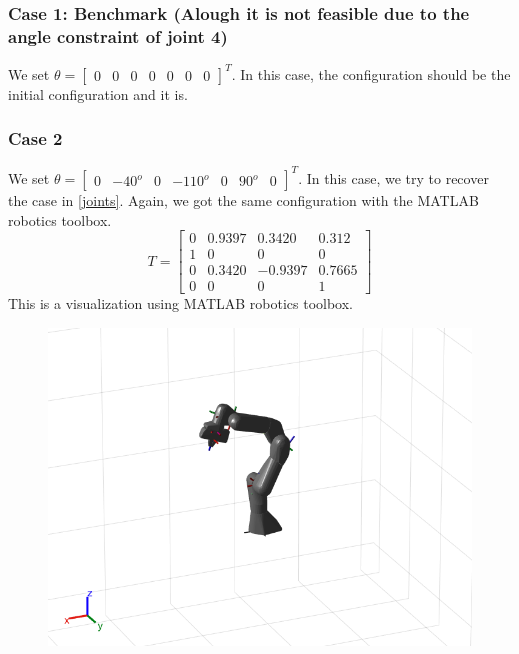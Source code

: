 \documentclass[english,10pt,a4paper]{article}
\begin{document}
    \subsubsection*{Case 1: Benchmark (Alough it is not feasible due to the angle constraint of joint 4)}
    We set $\theta = \begin{bmatrix}
        0 & 0 & 0 & 0 & 0 & 0 & 0
    \end{bmatrix}^T$. In this case, the configuration should be the initial configuration and it is.
    \subsubsection*{Case 2}
    We set $\theta = \begin{bmatrix}
        0 & -40^o & 0 & -110^o & 0 & 90^o & 0
    \end{bmatrix}^T$. In this case, we try to recover the case in \ref{joints}. Again, we got the same configuration with the MATLAB robotics toolbox.
    $$T = \begin{bmatrix}
        0 & 0.9397 & 0.3420 & 0.312 \\ 1 & 0 & 0 & 0\\ 0 & 0.3420 & -0.9397 & 0.7665\\ 0 & 0 & 0 & 1
    \end{bmatrix}$$
    This is a visualization using MATLAB robotics toolbox.
    \begin{figure}[H]
        \includegraphics[scale=0.7]{p1t2.png}
    \end{figure}
    
\end{document}
